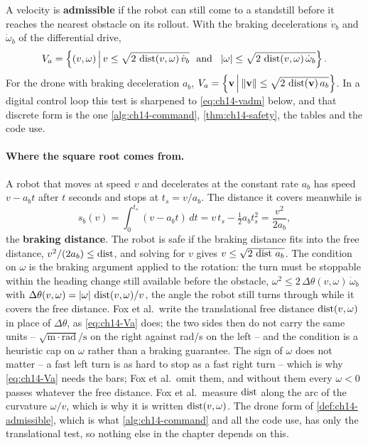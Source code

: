 \begin{definition}
\label{def:ch14-admissible}
A velocity is \textbf{admissible}
if the robot can still come to a standstill before it reaches the nearest
obstacle on its rollout. With the braking decelerations $\dot v_b$ and
$\dot\omega_b$ of the differential drive,
\begin{equation}
  V_a = \left\{ (v, \omega) \,\middle|\, v \le \sqrt{2\,\operatorname{dist}(v,\omega)\,\dot v_b}
  \ \text{ and }\ \left\lvert \omega \right\rvert \le \sqrt{2\,\operatorname{dist}(v,\omega)\,\dot\omega_b} \right\}.
  \label{eq:ch14-Va}
\end{equation}
For the drone with braking deceleration $a_b$,
$V_a = \left\{ \mathbf{v} \,\middle|\, \left\lVert \mathbf{v} \right\rVert \le \sqrt{2\,\operatorname{dist}(\mathbf{v})\,a_b} \right\}$. In a
digital control loop this test is sharpened to \cref{eq:ch14-vadm} below, and
that discrete form is the one \cref{alg:ch14-command}, \cref{thm:ch14-safety},
the tables and the code use.
\end{definition}

\paragraph{Where the square root comes from.}
A robot that moves at speed $v$ and decelerates at the constant rate $a_b$ has
speed $v - a_b t$ after $t$ seconds and stops at $t_s = v/a_b$. The distance it
covers meanwhile is
\begin{equation}
  s_b(v) = \int_0^{t_s} (v - a_b t)\,dt = v\,t_s - \tfrac{1}{2} a_b t_s^2
         = \frac{v^2}{2 a_b},
  \label{eq:ch14-braking}
\end{equation}
the \textbf{braking distance}. The robot is safe if the
braking distance fits into the free distance, $v^2/(2a_b) \le \operatorname{dist}$, and
solving for $v$ gives $v \le \sqrt{2\,\operatorname{dist}\,a_b}$. The condition on
$\omega$ is the braking argument applied to the rotation: the turn must be
stoppable within the heading change still available before the obstacle,
$\omega^2 \le 2\,\Delta\theta(v,\omega)\,\dot\omega_b$ with
$\Delta\theta(v,\omega) = \left\lvert \omega \right\rvert\,\operatorname{dist}(v,\omega)/v$, the angle the
robot still turns through while it covers the free distance. Fox et al.\
write the translational free distance $\operatorname{dist}(v,\omega)$ in place of
$\Delta\theta$, as \cref{eq:ch14-Va} does; the two sides then do not carry
the same units -- $\sqrt{\mathrm{m}\cdot\mathrm{rad}}/\mathrm{s}$ on the
right against rad/s on the left -- and the condition is a heuristic cap on
$\omega$ rather than a braking guarantee. The sign of $\omega$ does not
matter -- a fast left turn is as hard to stop as a fast right turn -- which
is why \cref{eq:ch14-Va} needs the bars; Fox et al.\ omit them, and without
them every $\omega < 0$ passes whatever the free distance. Fox et al.\
measure $\operatorname{dist}$ along the arc of the curvature $\omega/v$, which is why it is
written $\operatorname{dist}(v,\omega)$. The drone form of \cref{def:ch14-admissible},
which is what \cref{alg:ch14-command} and all the code use, has only the
translational test, so nothing else in the chapter depends on this.

